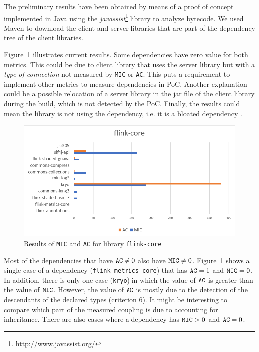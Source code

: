 \documentclass[a4paper]{article}
\begin{document}
The preliminary results have been obtained by means of a proof of concept implemented in Java using the \textit{javassist}\footnote{\url{http://www.javassist.org/}} library to analyze  bytecode. We used Maven to download the client and server libraries that are part of the dependency tree of the client libraries.

Figure~\ref{fig:flink-core} illustrates current results. Some dependencies have zero value for both metrics. This could be due to client library that uses the server library but with a \textit{type of connection} not measured by \texttt{MIC} or \texttt{AC}. This puts a requirement to implement other metrics to measure dependencies in PoC. Another explanation could be a possible relocation of a server library in the jar file of the client library during the build, which is not detected by the PoC. Finally, the results could mean the library is not using the dependency, i.e. it is a bloated dependency \cite{soto2020comprehensive}.

\begin{figure}[ht]
\begin{center}
\includegraphics[width=\linewidth]{img/flink-core-excel.png}
\caption{Results of \texttt{MIC} and \texttt{AC} for library \texttt{flink-core}}
\label{fig:flink-core}
\end{center}
\end{figure}

Most of the dependencies that have $\verb|AC| \neq 0$ also have $\verb|MIC| \neq 0$. Figure~\ref{fig:flink-core} shows a single case of a dependency (\texttt{flink-metrics-core}) that has $\verb|AC| = 1$ and $\verb|MIC| = 0$. In addition, there is only one case (\texttt{kryo}) in which the value of $\verb|AC|$ is greater than the value of $\verb|MIC|$. However, the value of $\verb|AC|$ is mostly due to the detection of the descendants of the declared types (criterion 6). It might be interesting to compare which part of the measured coupling is due to accounting for inheritance.
There are also cases where a dependency has $\verb|MIC| > 0$ and $\verb|AC| = 0$.
\end{document}
